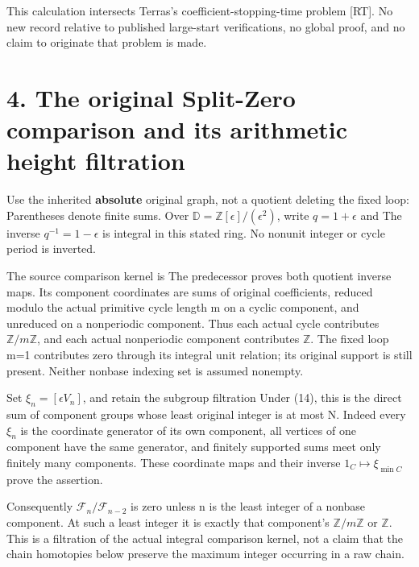 This calculation intersects Terras's coefficient-stopping-time problem
{[}RT{]}. No new record relative to published large-start verifications,
no global proof, and no claim to originate that problem is made.

\section{4. The original Split-Zero comparison and its arithmetic height
filtration}

Use the inherited \textbf{absolute} original graph, not a quotient
deleting the fixed loop:
 Parentheses denote finite
sums. Over \(\mathbb D=\mathbb Z[\epsilon]/(\epsilon^2)\), write
\(q=1+\epsilon\) and  The inverse
\(q^{-1}=1-\epsilon\) is integral in this stated ring. No nonunit
integer or cycle period is inverted.

The source comparison kernel is
The predecessor proves both quotient inverse maps. Its component
coordinates are sums of original coefficients, reduced modulo the actual
primitive cycle length m on a cyclic component, and unreduced on a
nonperiodic component. Thus each actual cycle contributes
\(\mathbb Z/m\mathbb Z\), and each actual nonperiodic component
contributes \(\mathbb Z\). The fixed loop m=1 contributes zero through
its integral unit relation; its original support is still present.
Neither nonbase indexing set is assumed nonempty.

Set \(\xi_n=[\epsilon V_n]\), and retain the subgroup filtration
Under (14), this is the direct sum of component groups whose least
original integer is at most N. Indeed every \(\xi_n\) is the coordinate
generator of its own component, all vertices of one component have the
same generator, and finitely supported sums meet only finitely many
components. These coordinate maps and their inverse
\(1_C\mapsto\xi_{\min C}\) prove the assertion.

Consequently \(\mathcal F_n/\mathcal F_{n-2}\) is zero unless n is the
least integer of a nonbase component. At such a least integer it is
exactly that component's \(\mathbb Z/m\mathbb Z\) or \(\mathbb Z\). This
is a filtration of the actual integral comparison kernel, not a claim
that the chain homotopies below preserve the maximum integer occurring
in a raw chain.

